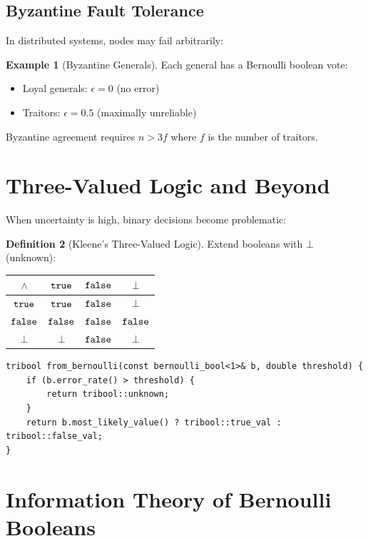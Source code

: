 \documentclass[11pt,twoside,openright]{book}
\theoremstyle{definition}
\newtheorem{definition}{Definition}[chapter]
\newtheorem{example}[definition]{Example}
\theoremstyle{plain}
\theoremstyle{remark}
\begin{document}
\subsection{Byzantine Fault Tolerance}

In distributed systems, nodes may fail arbitrarily:

\begin{example}[Byzantine Generals]
Each general has a Bernoulli boolean vote:
\begin{itemize}
    \item Loyal generals: $\epsilon = 0$ (no error)
    \item Traitors: $\epsilon = 0.5$ (maximally unreliable)
\end{itemize}
Byzantine agreement requires $n > 3f$ where $f$ is the number of traitors.
\end{example}

\section{Three-Valued Logic and Beyond}

When uncertainty is high, binary decisions become problematic:

\begin{definition}[Kleene's Three-Valued Logic]
Extend booleans with $\bot$ (unknown):
\begin{center}
\begin{tabular}{c|ccc}
$\wedge$ & $\mathtt{true}$ & $\mathtt{false}$ & $\bot$ \\
\hline
$\mathtt{true}$ & $\mathtt{true}$ & $\mathtt{false}$ & $\bot$ \\
$\mathtt{false}$ & $\mathtt{false}$ & $\mathtt{false}$ & $\mathtt{false}$ \\
$\bot$ & $\bot$ & $\mathtt{false}$ & $\bot$ \\
\end{tabular}
\end{center}
\end{definition}

\begin{verbatim}
tribool from_bernoulli(const bernoulli_bool<1>& b, double threshold) {
    if (b.error_rate() > threshold) {
        return tribool::unknown;
    }
    return b.most_likely_value() ? tribool::true_val : tribool::false_val;
}
\end{verbatim}

\section{Information Theory of Bernoulli Booleans}
\end{document}
